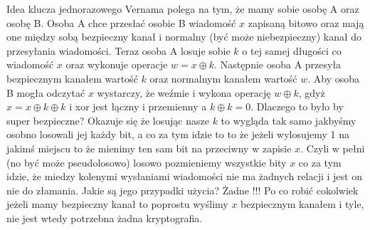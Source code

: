 Idea klucza jednorazowego Vernama polega na tym, że mamy sobie osobę A oraz osobę B. Osoba A chce przesłać osobie B wiadomość $x$ zapisaną bitowo oraz mają one między sobą bezpieczny kanał i normalny (być może niebezpieczny) kanał do przesyłania wiadomości. Teraz osoba A losuje sobie $k$ o tej samej długości co wiadomość $x$ oraz wykonuje operacje $w = x \oplus k$. Następnie osoba A przesyła bezpiecznym kanałem wartość $k$ oraz normalnym kanałem wartość $w$. Aby osoba B mogła odczytać $x$ wystarczy, że weźmie i wykona operację $w \oplus k$, gdyż $x = x \oplus k \oplus k$ i xor jest łączny i przemienny a $k \oplus k = 0$. \newline \newline
Dlaczego to było by super bezpieczne? \newline
Okazuje się że losując nasze $k$ to wygląda tak samo jakbyśmy osobno losowali jej każdy bit, a co za tym idzie to to że jeżeli wylosujemy 1 na jakimś miejscu to że mienimy ten sam bit na przeciwny w zapisie $x$. Czyli w pełni (no być może pseudolosowo) losowo pozmieniemy wszystkie bity $x$ co za tym idzie, że miedzy kolenymi wysłaniami wiadomości nie ma żadnych relacji i jest on nie do złamania.
\newline \newline
Jakie są jego przypadki użycia? \newline 
Żadne !!! Po co robić cokolwiek jeżeli mamy bezpieczny kanał to poprostu wyślimy $x$ bezpiecznym kanałem i tyle, nie jest wtedy potrzebna żadna kryptografia.